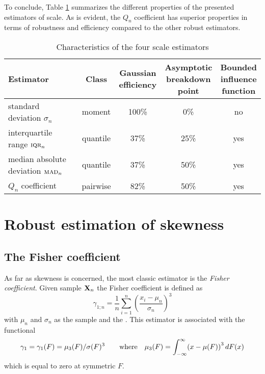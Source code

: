 To conclude, Table \ref{tab:stat:scale} summarizes the different properties of the
presented estimators of scale. As is evident, the $Q_n$ coefficient has superior
properties in terms of robustness and efficiency compared to the other robust 
estimators.

\begin{table}[h!]
    \centering
    \caption{Characteristics of the four scale estimators}
    \label{tab:stat:scale}
    \begin{tabular}{lcccc}
        \toprule
        Estimator
        & Class  
        & \subtab{c}{Gaussian\\ efficiency}
        & \subtab{c}{Asymptotic\\ breakdown\\ point} 
        & \subtab{c}{Bounded\\ influence\\ function}
        \\\midrule
        standard deviation $\sigma_n$              & moment   & 100\% &  0\% & no
        \\\addlinespace
        interquartile range $\stsc{IQR}_n$       & quantile & 37\%  & 25\% & yes
        \\\addlinespace
        median absolute deviation $\stsc{MAD}_n$ & quantile & 37\%  & 50\% & yes
        \\\addlinespace
        $Q_n$ coefficient                 & pairwise & 82\%  & 50\% & yes
        \\\bottomrule
    \end{tabular}
\end{table}



\section{Robust estimation of skewness}
\label{subsec:skewness}

\subsection{The Fisher coefficient}

As far as skewness is concerned, the most classic estimator is the \emph{Fisher
coefficient}. Given sample $\mathbf X_n$ the Fisher coefficient is defined as
\[
    \gamma_{1; n} = \frac{1}{n} \sum_{i=1}^n\left(\frac{x_i - \mu_n}{\sigma_n}\right)^{3}
\]
with $\mu_n$ and $\sigma_n$ as the sample  and the 
. This estimator is associated with the functional
\[
    \gamma_1 = \gamma_1(F) = \mu_{3}(F)/\sigma(F)^3
    \qquad\text{where}\quad
    \mu_{3}(F) = \int_{-\infty}^\infty \left(x-\mu(F)\right)^3 \dif F(x)
\]
which is equal to zero at symmetric $F$. 


